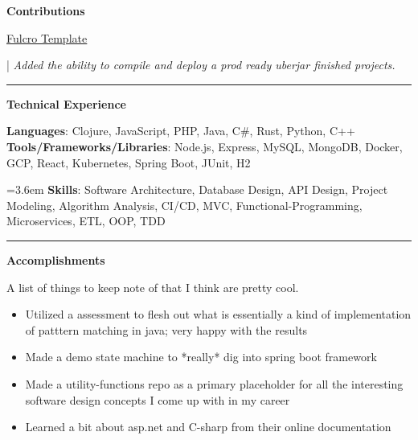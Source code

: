 \documentclass[letterpaper,11pt]{article}
\newcommand{\resumeItem}[1]{
  \item\small{
    {#1 \vspace{-2pt}}
  }
}
\newcommand{\resumeItemListStart}{\begin{itemize}}
\newcommand{\resumeItemListEnd}{\end{itemize}\vspace{-5pt}}
\begin{document}
\textbf{\large \textcolor{magic_blue}{Contributions}}

\begin{minipage}[t]{0.1 \textwidth}
	\raggedright
	\href{https://github.com/fulcrologic/fulcro-template}{\underline{Fulcro Template}}
\end{minipage}
\hfill
\begin{minipage}[t]{0.8\textwidth}
	\raggedright
	|\textit{ Added the ability to compile and deploy a prod ready uberjar finished projects. } \\
\end{minipage}

\noindent\rule{19.5cm}{0.4pt}

%
\textbf{\large \textcolor{magic_blue}{Technical Experience} }
\begin{onehalfspace}

	\textbf{ Languages}{: Clojure, JavaScript, PHP, Java, C\#, Rust, Python, C++ } \\

	\textbf{ Tools/Frameworks/Libraries}{: Node.js, Express, MySQL, MongoDB, Docker, GCP, React, Kubernetes, Spring Boot, JUnit, H2 } \\
\end{onehalfspace}

\hangindent=3.6em
\textbf{ Skills}{: }
Software Architecture, Database Design, API Design,
Project Modeling, Algorithm Analysis, CI/CD,
MVC, Functional-Programming, Microservices, ETL, OOP,
TDD

\noindent\rule{19.5cm}{0.4pt}


\textbf{\large \textcolor{magic_blue}{Accomplishments} }

A list of things to keep note of that I think are pretty cool.

\resumeItemListStart
\resumeItem{ Utilized a assessment to flesh out what is
essentially a kind of implementation of patttern matching
in java; very happy with the results }
\resumeItemListEnd

\resumeItemListStart
\resumeItem{ Made a demo state machine to *really* dig
into spring boot framework }
\resumeItemListEnd

\resumeItemListStart
\resumeItem{ Made a utility-functions repo as a primary
placeholder for all the interesting software design concepts
I come up with in my career }
\resumeItemListEnd

\resumeItemListStart
\resumeItem{ Learned a bit about asp.net and C-sharp from 
their online documentation }
\resumeItemListEnd
\end{document}
